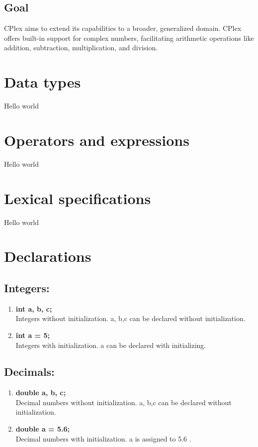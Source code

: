 \documentclass[12pt]{article}
\begin{document}
\subsection{Goal}
CPlex aims to extend its capabilities to a broader, generalized domain. CPlex offers built-in support for complex numbers, facilitating arithmetic operations like addition, subtraction, multiplication, and division. 
\section{Data types}
Hello world 
\section{Operators and expressions}
Hello world 
\section{Lexical specifications}
Hello world 
\section{Declarations}
\subsection{Integers:}

\begin{enumerate}
    \item \textbf{int a, b, c;} \\
        Integers without initialization. a, b,c can be declared without initialization.
    \item  \textbf{int a = 5;}\\
        Integers with initialization. a can be declared with initializing.
\end{enumerate}

\subsection{Decimals:}
\begin{enumerate}
    \item \textbf{double a, b, c;} \\
        Decimal numbers without initialization. a, b,c can be declared without initialization.
    \item  \textbf{double a = 5.6;}\\
        Decimal numbers with initialization. a is assigned to 5.6 .
\end{enumerate}
\end{document}

